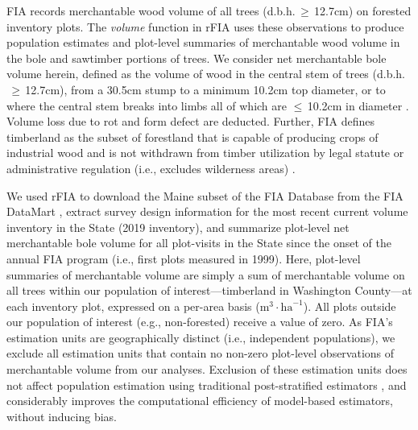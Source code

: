 \documentclass[11pt]{article}
\begin{document}
FIA records merchantable wood volume of all trees (d.b.h.$\, \geq \,$12.7cm) on forested inventory plots. The \textit{volume} function in rFIA uses these observations to produce population estimates and plot-level summaries of merchantable wood volume in the bole and sawtimber portions of trees. We consider net merchantable bole volume herein, defined as the volume of wood in the central stem of trees (d.b.h.$\, \geq \,$12.7cm), from a 30.5cm stump to a minimum 10.2cm top diameter, or to where the central stem breaks into limbs all of which are $\leq \,$10.2cm in diameter \citep{database}. Volume loss due to rot and form defect are deducted. Further, FIA defines timberland as the subset of forestland that is capable of producing crops of industrial wood and is not withdrawn from timber utilization by legal statute or administrative regulation (i.e., excludes wilderness areas) \citep{database}. 

We used rFIA to download the Maine subset of the FIA Database from the FIA DataMart \citep{datamart}, extract survey design information for the most recent current volume inventory in the State (2019 inventory), and summarize plot-level net merchantable bole volume for all plot-visits in the State since the onset of the annual FIA program (i.e., first plots measured in 1999). Here, plot-level summaries of merchantable volume are simply a sum of merchantable volume on all trees within our population of interest---timberland in Washington County---at each inventory plot, expressed on a per-area basis ($\mathrm{m}^{3} \cdot \mathrm{ha}^{-1}$). All plots outside our population of interest (e.g., non-forested) receive a value of zero. As FIA's estimation units are geographically distinct (i.e., independent populations), we exclude all estimation units that contain no non-zero plot-level observations of merchantable volume from our analyses. Exclusion of these estimation units does not affect population estimation using traditional post-stratified estimators \citep{bechtold2005enhanced}, and considerably improves the computational efficiency of model-based estimators, without inducing bias.
\end{document}
